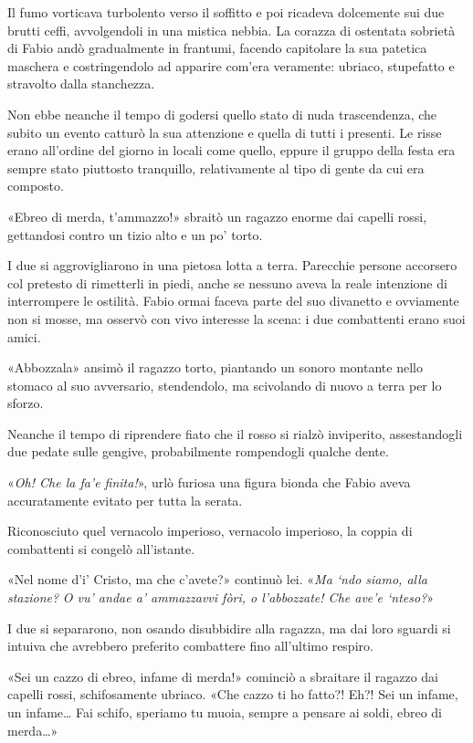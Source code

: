 Il fumo vorticava turbolento verso il soffitto e poi ricadeva dolcemente sui due brutti ceffi, avvolgendoli in una mistica nebbia. La corazza di ostentata sobrietà di Fabio andò gradualmente in frantumi, facendo capitolare la sua patetica maschera e costringendolo ad apparire com'era veramente: ubriaco, stupefatto e stravolto dalla stanchezza.

Non ebbe neanche il tempo di godersi quello stato di nuda trascendenza, che subito un evento catturò la sua attenzione e quella di tutti i presenti. Le risse erano all'ordine del giorno in locali come quello, eppure il gruppo della festa era sempre stato piuttosto tranquillo, relativamente al tipo di gente da cui era composto.

«Ebreo di merda, t'ammazzo!» sbraitò un ragazzo enorme dai capelli rossi, gettandosi contro un tizio alto e un po' torto.

I due si aggrovigliarono in una pietosa lotta a terra. Parecchie persone accorsero col pretesto di rimetterli in piedi, anche se nessuno aveva la reale intenzione di interrompere le ostilità. Fabio ormai faceva parte del suo divanetto e ovviamente non si mosse, ma osservò con vivo interesse la scena: i due combattenti erano suoi amici.

«Abbozzala» ansimò il ragazzo torto, piantando un sonoro montante nello stomaco al suo avversario, stendendolo, ma scivolando di nuovo a terra per lo sforzo.

Neanche il tempo di riprendere fiato che il rosso si rialzò inviperito, assestandogli due pedate sulle gengive, probabilmente rompendogli qualche dente.

«\emph{Oh! Che la fa'e finita!}», urlò furiosa una figura bionda che Fabio aveva accuratamente evitato per tutta la serata.

Riconosciuto quel vernacolo imperioso, vernacolo imperioso, la coppia di combattenti si congelò all'istante.

«Nel nome d'i' Cristo, ma che c'avete?» continuò lei. «\emph{Ma `ndo siamo, alla stazione?} \emph{O vu' andae a' ammazzavvi fòri, o l'abbozzate! Che ave'e `nteso?}»

I due si separarono, non osando disubbidire alla ragazza, ma dai loro sguardi si intuiva che avrebbero preferito combattere fino all'ultimo respiro.

«Sei un cazzo di ebreo, infame di merda!» cominciò a sbraitare il ragazzo dai capelli rossi, schifosamente ubriaco. «Che cazzo ti ho fatto?! Eh?! Sei un infame, un infame\ldots{} Fai schifo, speriamo tu muoia, sempre a pensare ai soldi, ebreo di merda\ldots{}»


